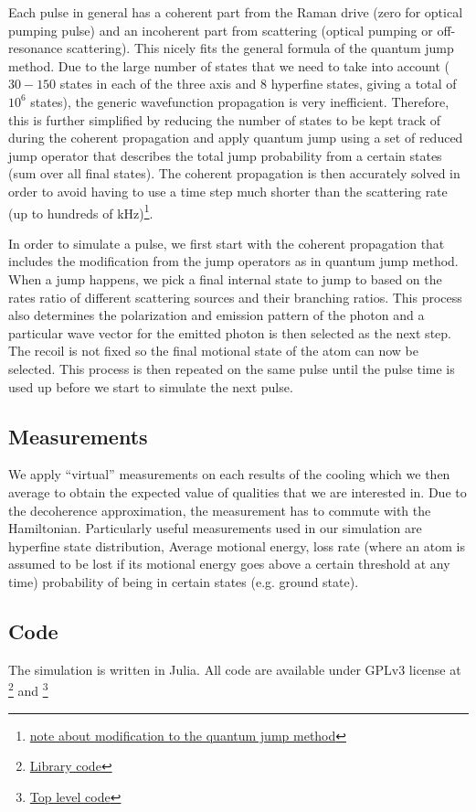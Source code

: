 \documentclass[aps,twocolumn,secnumarabic,balancelastpage,amsmath,amssymb]{revtex4}
\begin{document}
Each pulse in general has a coherent part from the Raman drive (zero for optical pumping pulse)
and an incoherent part from scattering (optical pumping or off-resonance scattering).
This nicely fits the general formula of the quantum jump method. Due to the large number of
states that we need to take into account ($30-150$ states in each of the three axis and
$8$ hyperfine states, giving a total of $10^6$ states),
the generic wavefunction propagation is very inefficient.
Therefore, this is further simplified by reducing the number of states to be kept track of during
the coherent propagation and apply quantum jump using a set of reduced jump operator that
describes the total jump probability from a certain states (sum over all final states).
The coherent propagation is then accurately solved in order to avoid having to use a time step
much shorter than the scattering rate (up to hundreds of kHz)\footnote{\href{https://github.com/nacs-lab/yyc-data/blob/3b50baae233ba54456cc35260d91208a23021410/notes/precise-quantum-jump.pdf}{note about modification to the quantum jump method}}.

In order to simulate a pulse, we first start with the coherent propagation that includes the
modification from the jump operators as in quantum jump method.
When a jump happens, we pick a final internal state to jump to based on the rates ratio
of different scattering sources and their branching ratios.
This process also determines the polarization and emission pattern of the photon and
a particular wave vector for the emitted photon is then selected as the next step.
The recoil is not fixed so the final motional state of the atom can now be selected.
This process is then repeated on the same pulse until the pulse time is used up before
we start to simulate the next pulse.

\subsection{Measurements}

We apply ``virtual'' measurements on each results of the cooling which we then average to
obtain the expected value of qualities that we are interested in.
Due to the decoherence approximation, the measurement has to commute with the Hamiltonian.
Particularly useful measurements used in our simulation are hyperfine state distribution,
Average motional energy, loss rate (where an atom is assumed to be lost if its motional energy
goes above a certain threshold at any time) probability of being in certain states
(e.g. ground state).

\subsection{Code}

The simulation is written in Julia. All code are available under GPLv3 license at
\footnote{\href{https://github.com/nacs-lab/yyc-data/tree/3b50baae233ba54456cc35260d91208a23021410/lib}{Library code}} and
\footnote{\href{https://github.com/nacs-lab/yyc-data/blob/3b50baae233ba54456cc35260d91208a23021410/calculations/sideband/sideband.jl}{Top level code}}
\end{document}
